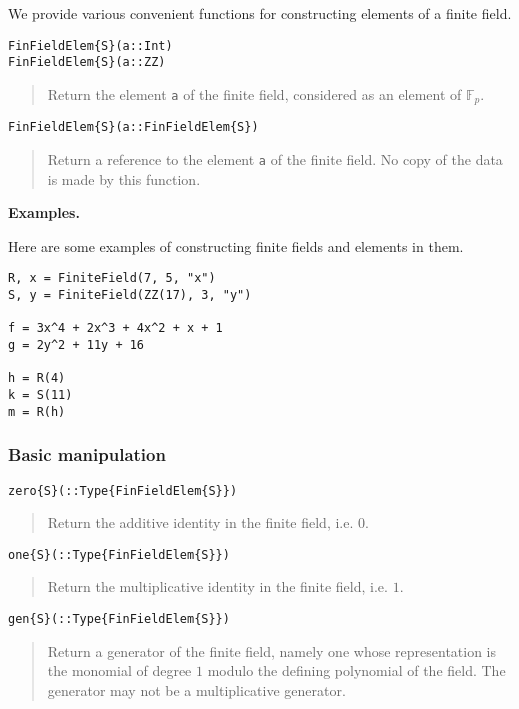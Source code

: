 \documentclass[a4paper,10pt]{article}
\newcommand{\F}{\mathbb{F}}
\newcommand{\code}{\lstinline}
\newcommand{\desc}[1]{\vspace{-3mm}\begin{quote}#1\end{quote}}
\begin{document}
{{We provide various convenient functions for constructing elements of a finite
field.

\begin{lstlisting}
FinFieldElem{S}(a::Int)
FinFieldElem{S}(a::ZZ)
\end{lstlisting}

\desc{Return the element \code{a} of the finite field, considered as an element
of $\F_p$.}

\begin{lstlisting}
FinFieldElem{S}(a::FinFieldElem{S})
\end{lstlisting}

\desc{Return a reference to the element \code{a} of the finite field. No copy
of the data is made by this function.}

\textbf{Examples.}

Here are some examples of constructing finite fields and elements in them.

\begin{lstlisting}
R, x = FiniteField(7, 5, "x")
S, y = FiniteField(ZZ(17), 3, "y")

f = 3x^4 + 2x^3 + 4x^2 + x + 1
g = 2y^2 + 11y + 16

h = R(4)
k = S(11)
m = R(h)
\end{lstlisting}

\subsubsection{Basic manipulation}

\begin{lstlisting}
zero{S}(::Type{FinFieldElem{S}})
\end{lstlisting}

\desc{Return the additive identity in the finite field, i.e. $0$.}

\begin{lstlisting}
one{S}(::Type{FinFieldElem{S}})
\end{lstlisting}

\desc{Return the multiplicative identity in the finite field, i.e. $1$.}

\begin{lstlisting}
gen{S}(::Type{FinFieldElem{S}})
\end{lstlisting}

\desc{Return a generator of the finite field, namely one whose
representation is the monomial of degree $1$ modulo the defining
polynomial of the field. The generator may not be a multiplicative
generator.}

}}
\end{document}
